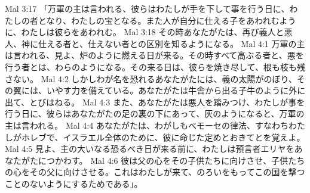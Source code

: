 Mal 3:17  「万軍の主は言われる、彼らはわたしが手を下して事を行う日に、わたしの者となり、わたしの宝となる。また人が自分に仕える子をあわれむように、わたしは彼らをあわれむ。
Mal 3:18  その時あなたがたは、再び義人と悪人、神に仕える者と、仕えない者との区別を知るようになる。
Mal 4:1  万軍の主は言われる、見よ、炉のように燃える日が来る。その時すべて高ぶる者と、悪を行う者とは、わらのようになる。その来る日は、彼らを焼き尽して、根も枝も残さない。
Mal 4:2  しかしわが名を恐れるあなたがたには、義の太陽がのぼり、その翼には、いやす力を備えている。あなたがたは牛舎から出る子牛のように外に出て、とびはねる。
Mal 4:3  また、あなたがたは悪人を踏みつけ、わたしが事を行う日に、彼らはあなたがたの足の裏の下にあって、灰のようになると、万軍の主は言われる。
Mal 4:4  あなたがたは、わがしもべモーセの律法、すなわちわたしがホレブで、イスラエル全体のために、彼に命じた定めとおきてとを覚えよ。
Mal 4:5  見よ、主の大いなる恐るべき日が来る前に、わたしは預言者エリヤをあなたがたにつかわす。
Mal 4:6  彼は父の心をその子供たちに向けさせ、子供たちの心をその父に向けさせる。これはわたしが来て、のろいをもってこの国を撃つことのないようにするためである」。


